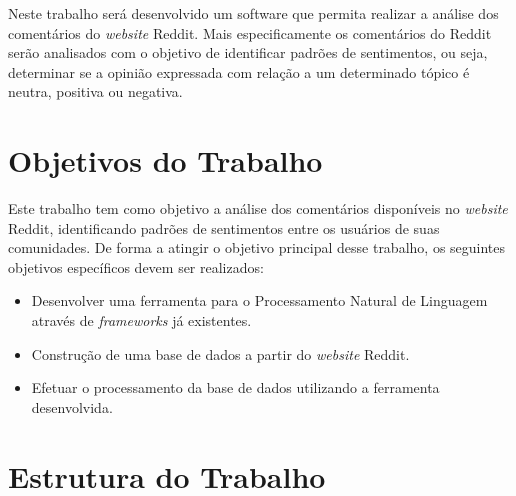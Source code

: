 Neste trabalho será desenvolvido um software que permita realizar a
análise dos comentários do \textit{website} Reddit. Mais
especificamente os comentários do Reddit serão analisados com o objetivo de
identificar padrões de sentimentos, ou seja, determinar se a opinião expressada com relação a um determinado tópico é neutra, positiva ou negativa.

\section{Objetivos do Trabalho}

Este trabalho tem como objetivo a análise dos comentários disponíveis no
\textit{website} Reddit, identificando padrões de sentimentos entre os
usuários de suas comunidades. De forma a atingir o objetivo principal desse
trabalho, os seguintes objetivos específicos devem ser realizados:
\begin{itemize}
  \item Desenvolver uma ferramenta para o Processamento Natural de Linguagem através de
\textit{frameworks} já existentes.
 \item Construção de uma base de dados a partir do \textit{website} Reddit.
 \item Efetuar o processamento da base de dados utilizando a ferramenta desenvolvida.
\end{itemize}

\section{Estrutura do Trabalho}

